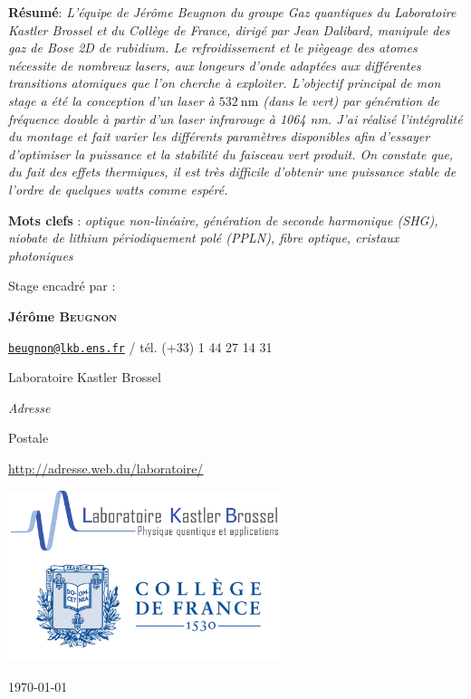 \documentclass[11pt,a4paper] { article}
\begin{document}
\begin{@empty}
\begin{center}
\parbox{15cm}{\small
	\textbf{R\'esum\'e}: \it L'équipe de Jérôme Beugnon du groupe Gaz quantiques du Laboratoire Kastler Brossel et du Collège de France, dirigé par Jean Dalibard, manipule des gaz de Bose 2D de rubidium. Le refroidissement et le piègeage des atomes nécessite de nombreux lasers, aux longeurs d'onde adaptées aux différentes transitions atomiques que l'on cherche à exploiter.
	L'objectif principal de mon stage a été la conception d'un laser à $\SI{532}{\nano\metre}$ (dans le vert) par génération de fréquence double à partir d'un laser infrarouge à 1064 nm. J'ai réalisé l'intégralité du montage et fait varier les différents paramètres disponibles afin d'essayer d'optimiser la puissance et la stabilité du faisceau vert produit. On constate que, du fait des effets thermiques, il est très difficile d'obtenir une puissance stable de l'ordre de quelques watts comme espéré. 
\vspace{0.5cm}
} 


\vspace{0.5cm}

\parbox{15cm}{
\textbf{Mots clefs} : \it optique non-linéaire, génération de seconde harmonique (SHG), niobate de lithium périodiquement polé (PPLN), fibre optique, cristaux photoniques}%

\vspace{0.5cm}

\parbox{15cm}{
Stage encadr\'e par :

{\bf Jérôme \textsc{Beugnon}}

\href{mailto:beugnon@lkb.ens.fr}{\tt beugnon@lkb.ens.fr} / t\'el. (+33) 1 44 27 14 31


Laboratoire Kastler Brossel

{\it Adresse

Postale}

\url{http://adresse.web.du/laboratoire/}
} 

\vspace{0.5cm}

\includegraphics[height=5cm]{./img/logos.png}

\end{center}

\vfill
\hfill \today

\end{@empty}
\end{document}

